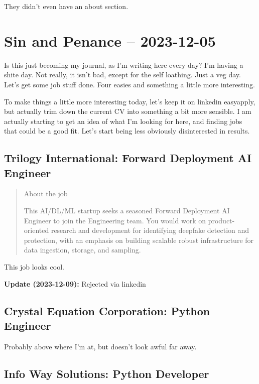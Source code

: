 \documentclass[
	letterpaper, %
	12pt, %
]{CSSullivanBusinessReport}
\begin{document}
They didn't even have an about section.


\section[5 Dec: LinkedIn]{Sin and Penance -- 2023-12-05} %

Is this just becoming my journal, as I'm writing here every day? I'm having a shite day. Not really, it isn't bad, except for the self loathing. Just a veg day. Let's get some job stuff done. Four easies and something a little more interesting. 

To make things a little more interesting today, let's keep it on linkedin easyapply, but actually trim down the current CV into something a bit more sensible. I am actually starting to get an idea of what I'm looking for here, and finding jobs that could be a good fit. Let's start being less obviously disinterested in results. 

\subsection[Trilogy International]{Trilogy International: Forward Deployment AI Engineer}

\begin{quote}
	About the job
	
	This AI/DL/ML startup seeks a seasoned Forward Deployment AI Engineer to join the Engineering team. You would work on product-oriented research and development for identifying deepfake detection and protection, with an emphasis on building scalable robust infrastructure for data ingestion, storage, and sampling.

\end{quote}

This job looks cool. 

\textbf{Update (2023-12-09):} Rejected via linkedin

\subsection[Crystal Equation Corporation]{Crystal Equation Corporation: Python Engineer}

Probably above where I'm at, but doesn't look awful far away. 

\subsection[Info Way Solutions]{Info Way Solutions: Python Developer}
\end{document}
